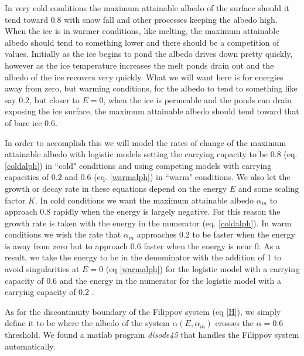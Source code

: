 \documentclass[10pt]{article}
\begin{document}
In very cold conditions the maximum attainable albedo of the surface should it tend toward $0.8$ with snow fall and other processes keeping the albedo high. When the ice is in warmer conditions, like melting, the maximum attainable albedo should tend to something lower and there should be a competition of values. Initially as the ice begins to pond the albedo drives down pretty quickly, however as the ice temperature increases the melt ponds drain out and the albedo of the ice recovers very quickly. What we will want here is for energies away from zero, but warming conditions, for the albedo to tend to something like say $0.2$, but closer to $E=0$, when the ice is permeable and the ponds can drain exposing the ice surface, the maximum attainable albedo should tend toward that of bare ice $0.6$.

In order to accomplish this we will model the rates of change of the maximum attainable albedo with logistic models setting the carrying capacity to be $0.8$ (eq. \ref{coldalph}) in ``cold" conditions and using competing models with carrying capacities of $0.2$ and  $0.6$ (eq. \ref{warmalph}) in ``warm" conditions. We also let the growth or decay rate in these equations depend on the energy $E$ and some scaling factor $K$. In cold conditions we want the maximum attainable albedo $\alpha_m$ to approach $0.8$ rapidly when the energy is largely negative. For this reason the growth rate is taken with the energy in the numerator (eq. \ref{coldalph}). In warm conditions we wish the rate that $\alpha_m$ approaches $0.2$ to be faster when the energy is away from zero but to approach $0.6$ faster when the energy is near 0.  As a result, we take the energy to be in the denominator with the addition of 1 to avoid singularities at $E=0$ (eq \ref{warmalph}) for the logistic model with a carrying capacity of $0.6$ and the energy in the numerator for the logistic model with a carrying capacity of $0.2$ . 

As for the discontinuity boundary of the Filippov system (eq \ref{H}), we simply define it to be where the albedo of the system $\alpha(E,\alpha_m)$ crosses the $\alpha=0.6$ threshold. We found a matlab program {\it disode45} \cite{Calvo16} that handles the Filippov system automatically.
\end{document}

